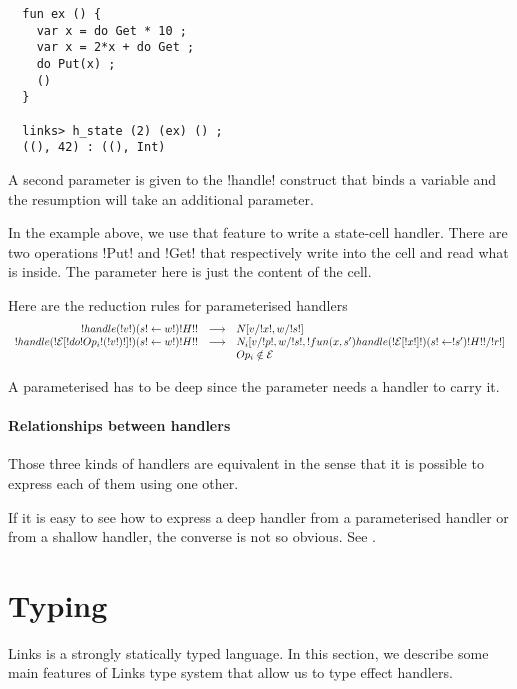 \documentclass[11pt, nonacm=true, language=french, language=english]{acmart}
\begin{document}
\begin{lstlisting}
  fun ex () {
    var x = do Get * 10 ;
    var x = 2*x + do Get ;
    do Put(x) ;
    ()
  }

  links> h_state (2) (ex) () ;
  ((), 42) : ((), Int)
\end{lstlisting}

A second parameter is given to the !handle! construct that binds a variable and the resumption will take an additional parameter.

In the example above, we use that feature to write a state-cell handler. There are two operations !Put! and !Get! that respectively write into the cell and read what is inside. The parameter here is just the content of the cell.

Here are the reduction rules for parameterised handlers
\[
  \begin{array}{rcll}
    !handle ( !v! ) ( s!\leftarrow w! ) { !H! }! & \longrightarrow & N[v/!x!, w/!s!] \\
    !handle ( !\mathcal E[!do !Op_{i}!( !v! )!]! ) ( s!\leftarrow w! ) { !H! }! & \longrightarrow & N_{i}[v/!p!, w/!s!, !fun (x, s')  { handle ( !\mathcal E[!x!] ! ) ( s!\leftarrow!s' ) { !H! } }!/!r!] \\
    &&Op_{i} \notin \mathcal E\\
  \end{array}
\]

\begin{rem}
  A parameterised has to be deep since the parameter needs a handler to carry it.
\end{rem}

\paragraph{Relationships between handlers}

Those three kinds of handlers are equivalent in the sense that it is possible to express each of them using one other.

If it is easy to see how to express a deep handler from a parameterised handler or from a shallow handler, the converse is not so obvious. See \cite{}.

\section{Typing}

Links is a strongly statically typed language. In this section, we describe some main features of Links type system that allow us to type effect handlers.
\end{document}
